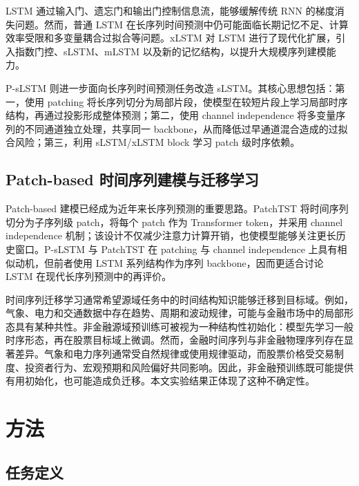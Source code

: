 \documentclass[UTF8,zihao=-4,twocolumn,fontset=fandol]{ctexart}
\begin{document}
LSTM 通过输入门、遗忘门和输出门控制信息流，能够缓解传统 RNN 的梯度消失问题\cite{hochreiter1997lstm}。然而，普通 LSTM 在长序列时间预测中仍可能面临长期记忆不足、计算效率受限和多变量耦合过拟合等问题。xLSTM 对 LSTM 进行了现代化扩展，引入指数门控、sLSTM、mLSTM 以及新的记忆结构，以提升大规模序列建模能力\cite{beck2024xlstm}。

P-sLSTM 则进一步面向长序列时间预测任务改造 sLSTM。其核心思想包括：第一，使用 patching 将长序列切分为局部片段，使模型在较短片段上学习局部时序结构，再通过投影形成整体预测；第二，使用 channel independence 将多变量序列的不同通道独立处理，共享同一 backbone，从而降低过早通道混合造成的过拟合风险；第三，利用 sLSTM/xLSTM block 学习 patch 级时序依赖\cite{kong2025pslstm}。

\subsection{Patch-based 时间序列建模与迁移学习}

Patch-based 建模已经成为近年来长序列预测的重要思路。PatchTST 将时间序列切分为子序列级 patch，将每个 patch 作为 Transformer token，并采用 channel independence 机制；该设计不仅减少注意力计算开销，也使模型能够关注更长历史窗口\cite{nie2023patchtst}。P-sLSTM 与 PatchTST 在 patching 与 channel independence 上具有相似动机，但前者使用 LSTM 系列结构作为序列 backbone，因而更适合讨论 LSTM 在现代长序列预测中的再评价。

时间序列迁移学习通常希望源域任务中的时间结构知识能够迁移到目标域。例如，气象、电力和交通数据中存在趋势、周期和波动规律，可能与金融市场中的局部形态具有某种共性。非金融源域预训练可被视为一种结构性初始化：模型先学习一般时序形态，再在股票目标域上微调。然而，金融时间序列与非金融物理序列存在显著差异。气象和电力序列通常受自然规律或使用规律驱动，而股票价格受交易制度、投资者行为、宏观预期和风险偏好共同影响。因此，非金融预训练既可能提供有用初始化，也可能造成负迁移。本文实验结果正体现了这种不确定性。

\section{方法}

\subsection{任务定义}
\end{document}
